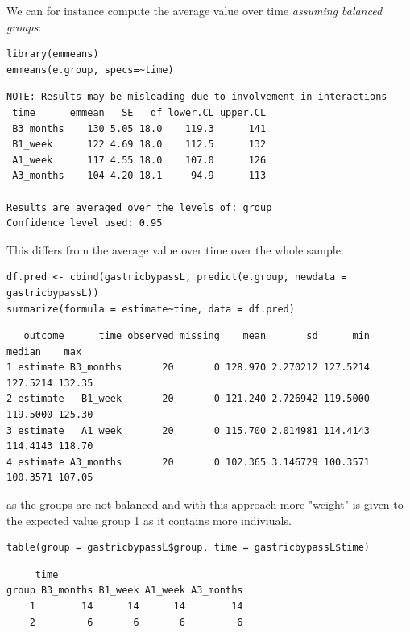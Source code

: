 \documentclass[12pt]{article}
\begin{document}
We can for instance compute the average value over time \emph{assuming balanced groups}:
\lstset{language=r,label= ,caption= ,captionpos=b,numbers=none}
\begin{lstlisting}
library(emmeans)
emmeans(e.group, specs=~time)
\end{lstlisting}

\begin{verbatim}
NOTE: Results may be misleading due to involvement in interactions
 time      emmean   SE   df lower.CL upper.CL
 B3_months    130 5.05 18.0    119.3      141
 B1_week      122 4.69 18.0    112.5      132
 A1_week      117 4.55 18.0    107.0      126
 A3_months    104 4.20 18.1     94.9      113

Results are averaged over the levels of: group 
Confidence level used: 0.95
\end{verbatim}


This differs from the average value over time over the whole sample:
\lstset{language=r,label= ,caption= ,captionpos=b,numbers=none}
\begin{lstlisting}
df.pred <- cbind(gastricbypassL, predict(e.group, newdata = gastricbypassL))
summarize(formula = estimate~time, data = df.pred)
\end{lstlisting}

\begin{verbatim}
   outcome      time observed missing    mean       sd      min   median    max
1 estimate B3_months       20       0 128.970 2.270212 127.5214 127.5214 132.35
2 estimate   B1_week       20       0 121.240 2.726942 119.5000 119.5000 125.30
3 estimate   A1_week       20       0 115.700 2.014981 114.4143 114.4143 118.70
4 estimate A3_months       20       0 102.365 3.146729 100.3571 100.3571 107.05
\end{verbatim}


as the groups are not balanced and with this approach more "weight" is
given to the expected value group 1 as it contains more indiviuals.
\lstset{language=r,label= ,caption= ,captionpos=b,numbers=none}
\begin{lstlisting}
table(group = gastricbypassL$group, time = gastricbypassL$time)
\end{lstlisting}

\begin{verbatim}
     time
group B3_months B1_week A1_week A3_months
    1        14      14      14        14
    2         6       6       6         6
\end{verbatim}
\end{document}
